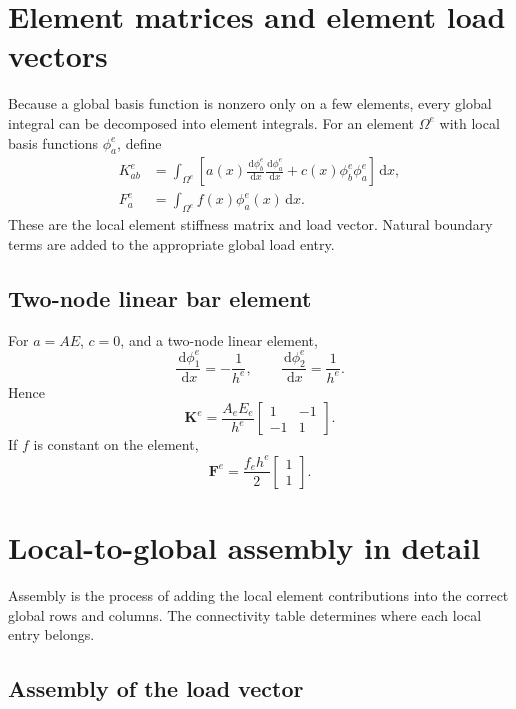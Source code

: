 \documentclass[11pt]{article}
\newcommand{\Om}{\Omega}
\newcommand{\dd}{\,\mathrm{d}}
\newcommand{\bKe}{\mathbf{K}^{e}}
\newcommand{\bFe}{\mathbf{F}^{e}}
\begin{document}
\section{Element matrices and element load vectors}

Because a global basis function is nonzero only on a few elements, every
global integral can be decomposed into element integrals. For an element
$\Om^e$ with local basis functions $\phi_a^e$, define
\begin{align}
K_{ab}^e
&=
\int_{\Om^e}
\left[
a(x)\frac{\dd\phi_b^e}{\dd x}
\frac{\dd\phi_a^e}{\dd x}
+c(x)\phi_b^e\phi_a^e
\right]\dd x,
\label{eq:element-K}\\
F_a^e
&=
\int_{\Om^e}f(x)\phi_a^e(x)\dd x.
\label{eq:element-F}
\end{align}
These are the local element stiffness matrix and load vector. Natural boundary
terms are added to the appropriate global load entry.

\subsection*{Two-node linear bar element}

For $a=AE$, $c=0$, and a two-node linear element,
\[
\frac{\dd\phi_1^e}{\dd x}=-\frac1{h^e},
\qquad
\frac{\dd\phi_2^e}{\dd x}=\frac1{h^e}.
\]
Hence
\begin{equation}
\boxed{
\bKe
=
\frac{A_eE_e}{h^e}
\begin{bmatrix}
1&-1\\
-1&1
\end{bmatrix}.}
\label{eq:linear-bar-K}
\end{equation}
If $f$ is constant on the element,
\begin{equation}
\boxed{
\bFe
=
\frac{f_eh^e}{2}
\begin{bmatrix}1\\1\end{bmatrix}.}
\label{eq:linear-load}
\end{equation}

\section{Local-to-global assembly in detail}

Assembly is the process of adding the local element contributions into the
correct global rows and columns. The connectivity table determines where each
local entry belongs.

\subsection{Assembly of the load vector}
\end{document}
